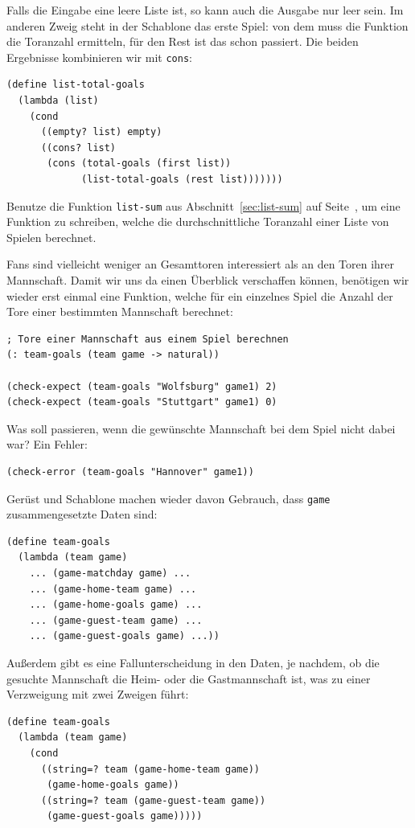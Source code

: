 %
Falls die Eingabe eine leere Liste ist, so kann auch die Ausgabe nur
leer sein.  Im anderen Zweig steht in der Schablone das erste Spiel:
von dem muss die Funktion die Toranzahl ermitteln, für den Rest ist
das schon passiert.  Die beiden Ergebnisse kombinieren wir mit
\lstinline{cons}:
%
\begin{lstlisting}
(define list-total-goals
  (lambda (list)
    (cond
      ((empty? list) empty)
      ((cons? list)
       (cons (total-goals (first list))
             (list-total-goals (rest list)))))))
\end{lstlisting}
%
\begin{aufgabeinline}
  Benutze die Funktion \lstinline{list-sum} aus
  Abschnitt~\ref{sec:list-sum} auf Seite~\pageref{sec:list-sum}, um
  eine Funktion zu schreiben, welche die durchschnittliche Toranzahl
  einer Liste von Spielen berechnet.
\end{aufgabeinline}
%
Fans sind vielleicht weniger an Gesamttoren interessiert als an den
Toren ihrer Mannschaft.  Damit wir uns da einen Überblick verschaffen
können, benötigen wir wieder erst einmal eine Funktion, welche für ein
einzelnes Spiel die Anzahl der Tore einer bestimmten Mannschaft berechnet:
%
\begin{lstlisting}
; Tore einer Mannschaft aus einem Spiel berechnen
(: team-goals (team game -> natural))

(check-expect (team-goals "Wolfsburg" game1) 2)
(check-expect (team-goals "Stuttgart" game1) 0)
\end{lstlisting}
%
Was soll passieren, wenn die gewünschte Mannschaft bei dem Spiel nicht
dabei war?  Ein Fehler:
%
\begin{lstlisting}
(check-error (team-goals "Hannover" game1))
\end{lstlisting}
%
Gerüst und Schablone machen wieder davon Gebrauch, dass
\lstinline{game} zusammengesetzte Daten sind:
%
\begin{lstlisting}
(define team-goals
  (lambda (team game)
    ... (game-matchday game) ...
    ... (game-home-team game) ...
    ... (game-home-goals game) ...
    ... (game-guest-team game) ...
    ... (game-guest-goals game) ...))
\end{lstlisting}
%
Außerdem gibt es eine Fallunterscheidung in den Daten, je nachdem, ob
die gesuchte Mannschaft die Heim- oder die Gastmannschaft ist, was zu
einer Verzweigung mit zwei Zweigen führt:
%
\begin{lstlisting}
(define team-goals
  (lambda (team game)
    (cond
      ((string=? team (game-home-team game))
       (game-home-goals game))
      ((string=? team (game-guest-team game))
       (game-guest-goals game)))))
\end{lstlisting}
